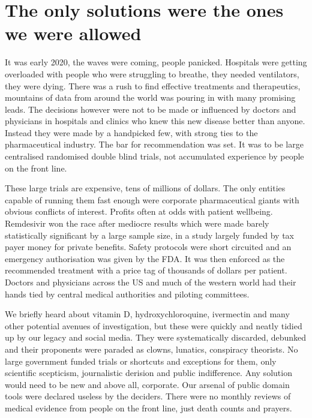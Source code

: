 \documentclass[11pt,a4paper]{article}
\begin{document}
\section*{The only solutions were the ones we were allowed}

It was early 2020, the waves were coming, people panicked. Hospitals were getting overloaded with people who were struggling to breathe, they needed ventilators, they were dying. There was a rush to find effective treatments and therapeutics, mountains of data from around the world was pouring in with many promising leads. The decisions however were not to be made or influenced by doctors and physicians in hospitals and clinics who knew this new disease better than anyone. Instead they were made by a handpicked few, with strong ties to the pharmaceutical industry. The bar for recommendation was set. It was to be large centralised randomised double blind trials, not accumulated experience by people on the front line.

These large trials are expensive, tens of millions of dollars. The only entities capable of running them  fast enough were corporate pharmaceutical giants with obvious conflicts of interest. Profits often at odds with patient wellbeing. Remdesivir won the race after mediocre results which were made barely statistically significant by a large sample size, in a study largely funded by tax payer money for private benefits. Safety protocols were short circuited and an emergency authorisation was given by the FDA. It was then enforced as the recommended treatment with a price tag of thousands of dollars per patient. Doctors and physicians across the US and much of the western world had their hands tied by central medical authorities and piloting committees. 

We briefly heard about vitamin D, hydroxychloroquine, ivermectin and many other potential avenues of investigation, but these were quickly and neatly tidied up by our legacy and social media. They were systematically discarded, debunked and their proponents were paraded as clowns, lunatics, conspiracy theorists. No large government funded trials or shortcuts and exceptions for them, only scientific scepticism, journalistic derision and public indifference. Any solution would need to be new and above all, corporate. Our arsenal of public domain tools were declared useless by the deciders. There were no monthly reviews of medical evidence from people on the front line, just death counts and prayers.
\end{document}
